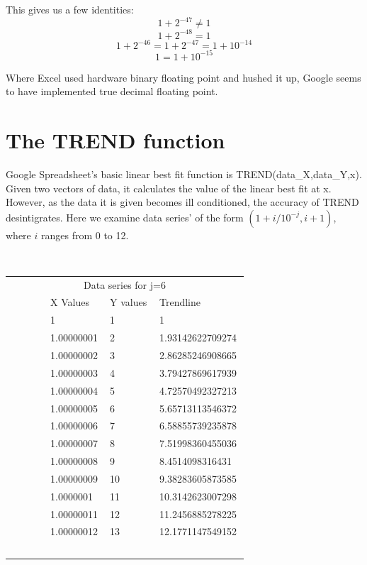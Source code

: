 \documentclass{article}
\begin{document}
\newpage
This gives us a few identities:\\
$$1 + 2^{-47} \ne 1$$
$$1 + 2^{-48} = 1$$
$$1 + 2^{-46} = 1 + 2^{-47} = 1 + 10^{-14}$$
$$1 = 1 + 10^{-15}$$

Where Excel used hardware binary floating point and hushed it up, Google seems to have implemented 
true decimal floating point.

\section*{The TREND function}
Google Spreadsheet's basic linear best fit function is TREND(data\_X,data\_Y,x).
Given two vectors of data, it calculates the value of the linear best fit at x.
However, as the data it is given becomes ill conditioned, the accuracy of TREND
desintigrates.  Here we examine data series' of the form ${(1 + i/10^{-j}, i + 1)}$,
where $i$ ranges from 0 to 12.\\
\begin{table}[h!]
  \centering
    \begin{tabular}{|l|l|l|}
        \multicolumn{3}{c}{Data series for j=6}\\
        X Values   & Y values & Trendline        \\
        1          & 1        & 1                \\ 
        1.00000001 & 2        & 1.93142622709274 \\ 
        1.00000002 & 3        & 2.86285246908665 \\ 
        1.00000003 & 4        & 3.79427869617939 \\ 
        1.00000004 & 5        & 4.72570492327213 \\ 
        1.00000005 & 6        & 5.65713113546372 \\ 
        1.00000006 & 7        & 6.58855739235878 \\ 
        1.00000007 & 8        & 7.51998360455036 \\ 
        1.00000008 & 9        & 8.4514098316431  \\ 
        1.00000009 & 10       & 9.38283605873585 \\ 
        1.0000001  & 11       & 10.3142623007298 \\ 
        1.00000011 & 12       & 11.2456885278225 \\ 
        1.00000012 & 13       & 12.1771147549152 \\
    \end{tabular}
\end{table}
\end{document}
